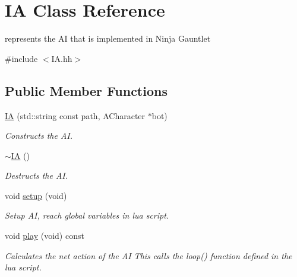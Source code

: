 \hypertarget{classIA}{}\section{IA Class Reference}
\label{classIA}


represents the AI that is implemented in Ninja Gauntlet  




{\ttfamily \#include $<$I\+A.\+hh$>$}

\subsection*{Public Member Functions}
\begin{DoxyCompactItemize}
\item 
\hyperlink{classIA_a0733aa0c9dd00b142f8b474fc3b0b714}{IA} (std\+::string const path, A\+Character $\ast$bot)
\begin{DoxyCompactList}\small\item\em Constructs the AI. \end{DoxyCompactList}\item 
\mbox{\label{classIA_a67d4dd285ae5169239348432bab9ad0e}} 
\hyperlink{classIA_a67d4dd285ae5169239348432bab9ad0e}{$\sim$\+IA} ()
\begin{DoxyCompactList}\small\item\em Destructs the AI. \end{DoxyCompactList}\item 
\mbox{\label{classIA_af500668744c1eaa6345db6d062e463fc}} 
void \hyperlink{classIA_af500668744c1eaa6345db6d062e463fc}{setup} (void)
\begin{DoxyCompactList}\small\item\em Setup AI, reach global variables in lua script. \end{DoxyCompactList}\item 
\mbox{\label{classIA_a81df51f46b3b30ff6bece457d094b3fc}} 
void \hyperlink{classIA_a81df51f46b3b30ff6bece457d094b3fc}{play} (void) const
\begin{DoxyCompactList}\small\item\em Calculates the net action of the AI This calls the loop() function defined in the lua script. \end{DoxyCompactList}\end{DoxyCompactItemize}
